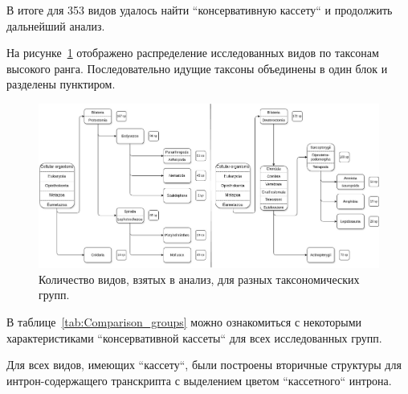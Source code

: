 В итоге для 353 видов удалось найти ``консервативную кассету`` и продолжить дальнейший анализ.


На рисунке~\ref{fig:tree_summary} отображено распределение исследованных видов по таксонам высокого ранга.
Последовательно идущие таксоны объединены в один блок и разделены пунктиром.

\begin{figure}[h] %
    \centering
    \includegraphics[width=1.0\textwidth]{images/Tree_summary}
    \caption{Количество видов, взятых в анализ, для разных таксономических групп.}
    \label{fig:tree_summary}
\end{figure}

В таблице~\ref{tab:Comparison_groups} можно ознакомиться с некоторыми характеристиками ``консервативной кассеты`` для всех исследованных групп.

Для всех видов, имеющих ``кассету``, были построены вторичные структуры для интрон-содержащего транскрипта с выделением цветом ``кассетного`` интрона.



